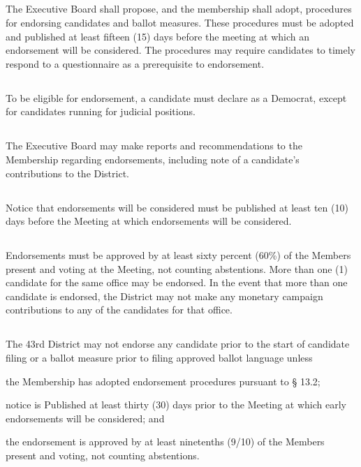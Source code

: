 \documentclass{article}
\newcommand{\fortythird}{\nth{43}}
\newcommand{\district}{\fortythird{} District}
\newcommand{\thedistrict}{the \district{}}
\begin{document}
\subsection{}
The Executive Board shall propose, and the membership shall adopt, procedures for endorsing candidates and ballot measures. These procedures must be adopted and published at least fifteen (15) days before the meeting at which an endorsement will be considered. The procedures may require candidates to timely respond to a questionnaire as a prerequisite to endorsement.

\subsection{}
To be eligible for endorsement, a candidate must declare as a Democrat, except for candidates running for judicial positions.

\subsection{}
The Executive Board may make reports and recommendations to the Membership regarding endorsements, including note of a candidate’s contributions to \thedistrict{}.

\subsection{}
Notice that endorsements will be considered must be published at least ten (10) days before the Meeting at which endorsements will be considered.

\subsection{}
Endorsements must be approved by at least sixty percent (60\%) of the Members present and voting at the Meeting, not counting abstentions. More than one (1) candidate for the same office may be endorsed. In the event that more than one candidate is endorsed, \thedistrict{} may not make any monetary campaign contributions to any of the candidates for that office.

\subsection{}
The 43rd District may not endorse any candidate prior to the start of candidate filing or a ballot measure prior to filing approved ballot language unless
\begin{inlinealphalist}
    \item the Membership has adopted endorsement procedures pursuant to § 13.2;
    \item notice is Published at least thirty (30) days prior to the Meeting at which early endorsements will be considered; and
    \item the endorsement is approved by at least ninetenths (9/10) of the Members present and voting, not counting abstentions.
\end{inlinealphalist}
\end{document}
